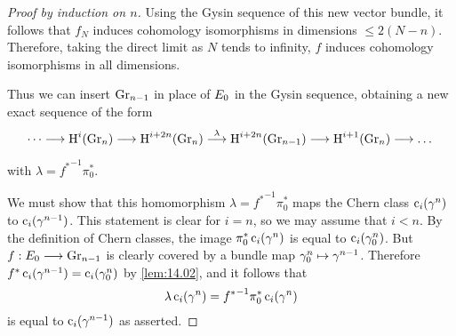 \documentclass[../main]{subfiles}
\begin{document}
\begin{proof}[Proof by induction on $n$]
Using the Gysin sequence of this new vector bundle, it follows that $f_N$ induces cohomology isomorphisms in dimensions $\leq 2(N-n)$. Therefore, taking the direct limit as $N$ tends to infinity, $f$ induces cohomology isomorphisms in all dimensions.

Thus we can insert $\operatorname{Gr}_{n-1}$ in place of $E_{0}$ in the Gysin sequence, obtaining a new exact sequence of the form
\[
\dots \longrightarrow \homology^i(\grassmannian_{n}) \longrightarrow \homology^{i+2n}(\grassmannian_{n}) \varrightarrow{\lambda} \homology^{i+2n}(\grassmannian_{n-1}) \longrightarrow \homology^{i+1}(\grassmannian_{n}) \longrightarrow \dots
\]
with $\lambda = {f^\ast}^{-1}\pi^\ast_0$.

We must show that this homomorphism $\lambda = {f^\ast}^{-1}\pi^\ast_0$ maps the Chern class $\operatorname{c}_i(\gamma^n)$ to $\operatorname{c}_i(\gamma^{n-1})$. This statement is clear for $i=n$, so we may assume that $i<n$. By the definition of Chern classes, the image $\pi_{0}^\ast \operatorname{c}_{i}(\gamma^{n})$ is equal to $\operatorname{c}_{i}(\gamma_{0}^{n})$. But $f: E_{0} \longrightarrow \operatorname{Gr}_{n-1}$ is clearly covered by a bundle map $\gamma_{0}^{n} \mapsto \gamma^{n-1}$. Therefore $f^\ast \operatorname{c}_i(\gamma^{n-1})=\operatorname{c}_i(\gamma_{0}^{n})$ by \ref{lem:14.02}, and it follows that
\[
\lambda \operatorname{c}_i(\gamma^{n}) = {f^\ast}^{-1} \pi_{0}^{\ast} \operatorname{c}_i(\gamma^{n})
\]
is equal to $\operatorname{c}_i(\gamma^{n-1})$ as asserted.


\end{proof}
\end{document}
